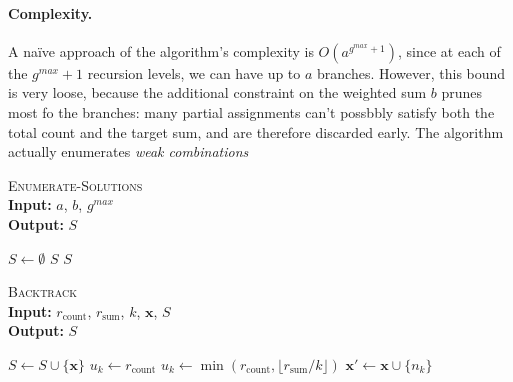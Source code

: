 \paragraph{Complexity.}
A naïve approach of the algorithm's complexity is $O(a^{g^{max}+1})$, since at each of the $g^{max}+1$ recursion levels,  we can have up to $a$ branches. However, this bound is very loose, because the additional constraint on the weighted sum $b$ prunes most fo the branches: many partial assignments can't possbbly satisfy both the total count and the target sum, and are therefore discarded early. The algorithm actually enumerates \emph{weak combinations} \cite{counting} 

\begin{algorithm}
  \caption{\textsc{Enumerate-Solutions} \\
  \textbf{Input:} $a$, $b$, $g^{max}$ \\
  \textbf{Output:} $S$}
  \begin{algorithmic}[]
      \State $S \gets \emptyset$ 
          \State \Return $S$
      \EndIf
      \State {} 
      \State \Return $S$
  \end{algorithmic}
\end{algorithm}

\begin{algorithm}
  \caption{\textsc{Backtrack} \\
  \textbf{Input:} $r_{\text{count}}$, $r_{\text{sum}}$, $k$, $\mathbf{x}$, $S$ \\
  \textbf{Output:} $S$}
  \begin{algorithmic}[]
       
              \State $S \gets S \cup \{\mathbf{x}\}$
          \EndIf
          \State \Return
      \EndIf
          \State $u_k \gets r_{\text{count}}$
      \Else
          \State $u_k \gets \min(r_{\text{count}}, \lfloor r_{\text{sum}} / k \rfloor)$
      \EndIf
          \State $\mathbf{x}' \gets \mathbf{x} \cup \{n_k\}$
          \State {}
      \EndFor
  \end{algorithmic}
\end{algorithm}


